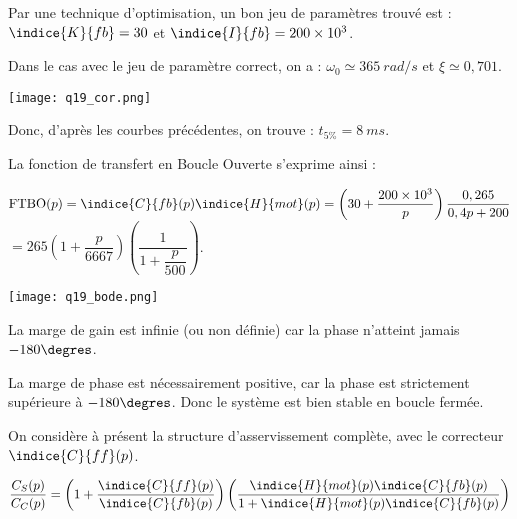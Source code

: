 Par une technique d’optimisation, un bon jeu de paramètres trouvé est : $\indice{K}{fb}=30$ et $\indice{I}{fb}=200\times10^{3}$.
\fi

\ifprof
\begin{corrige}
Dans le cas avec le jeu de paramètre correct, on a : $\omega_0 \simeq \SI{365}{rad/s}$ et  $\xi \simeq 0,701$.

\begin{center}
\texttt{[image: q19\_cor.png]}
\end{center}

Donc, d’après les courbes précédentes, on trouve : $t_{5\%} = \SI{8}{ms}$.

\end{corrige}
\else
\fi

\ifprof
\begin{corrige}
La fonction de transfert en Boucle Ouverte s’exprime ainsi :

$\text{FTBO}(p)=\indice{C}{fb} (p) \indice{H}{mot} (p)=\left(30+\dfrac{200\times 10^3}{p}\right)\dfrac{0,265}{0,4p+200}$ 
$=265\left(1+\dfrac{p}{6667}\right) \left(\dfrac{1}{1+\dfrac{p}{500}}\right)$.

\begin{center}
\texttt{[image: q19\_bode.png]}
\end{center}

La marge de gain est infinie (ou non définie) car la phase n’atteint jamais $-180\degres$.

La marge de phase est nécessairement positive, car la phase est strictement supérieure à $-180\degres$. Donc le système est bien stable en boucle fermée.
 


\end{corrige}
\else
\fi


On considère à présent la structure d'asservissement complète, avec le correcteur $\indice{C}{ff} (p)$.

\ifprof
\begin{corrige}
$$
\dfrac{C_S (p)}{C_C (p)}= \left(1+\dfrac{\indice{C}{ff} (p)}{\indice{C}{fb} (p)}\right) \left(\dfrac{\indice{H}{mot}(p) \indice{C}{fb} (p)}{1+\indice{H}{mot} (p)\indice{C}{fb} (p) }\right)
$$
\end{corrige}
\else
\fi


